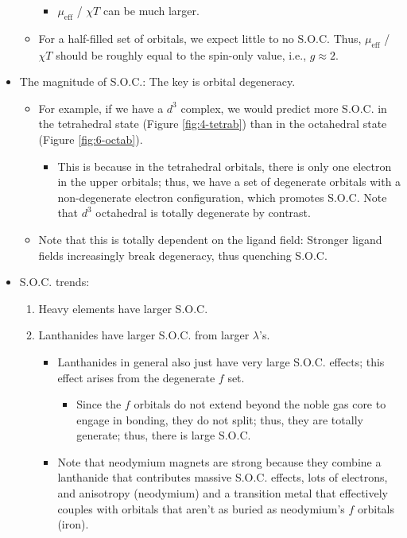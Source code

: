 \documentclass[../notes.tex]{subfiles}
\begin{document}
\begin{itemize}
\begin{itemize}
\begin{itemize}
            \item $\mu_\text{eff}$ / $\chi T$ can be much larger.
        \end{itemize}
        \item For a half-filled set of orbitals, we expect little to no S.O.C. Thus, $\mu_\text{eff}$ / $\chi T$ should be roughly equal to the spin-only value, i.e., $g\approx 2$.
    \end{itemize}
    \item The magnitude of S.O.C.: The key is orbital degeneracy.
    \begin{itemize}
        \item For example, if we have a $d^3$  complex, we would predict more S.O.C. in the tetrahedral state (Figure \ref{fig:4-tetrab}) than in the octahedral state (Figure \ref{fig:6-octab}).
        \begin{itemize}
            \item This is because in the tetrahedral orbitals, there is only one electron in the upper orbitals; thus, we have a set of degenerate orbitals with a non-degenerate electron configuration, which promotes S.O.C. Note that $d^3$ octahedral is totally degenerate by contrast.
        \end{itemize}
        \item Note that this is totally dependent on the ligand field: Stronger ligand fields increasingly break degeneracy, thus quenching S.O.C.
    \end{itemize}
    \item S.O.C. trends:
    \begin{enumerate}
        \item Heavy elements have larger S.O.C.
        \item Lanthanides have larger S.O.C. from larger $\lambda$'s.
        \begin{itemize}
            \item Lanthanides in general also just have very large S.O.C. effects; this effect arises from the degenerate $f$ set.
            \begin{itemize}
                \item Since the $f$ orbitals do not extend beyond the noble gas core to engage in bonding, they do not split; thus, they are totally generate; thus, there is large S.O.C.
            \end{itemize}
            \item Note that neodymium magnets are strong because they combine a lanthanide that contributes massive S.O.C. effects, lots of electrons, and anisotropy (neodymium) and a transition metal that effectively couples with orbitals that aren't as buried as neodymium's $f$ orbitals (iron).
        \end{itemize}
    \end{enumerate}
\end{itemize}
\end{document}
